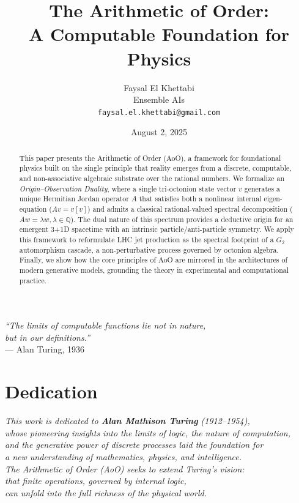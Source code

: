 \documentclass[11pt, a4paper]{article}
\title{\textbf{The Arithmetic of Order: \\ A Computable Foundation for Physics}}
\author{
    Faysal El Khettabi \\
    Ensemble AIs \\
    \texttt{faysal.el.khettabi@gmail.com}
}
\date{August 2, 2025}
\theoremstyle{definition}
\theoremstyle{remark}
\newcommand{\Q}{\mathbb{Q}}
\begin{document}
\begin{titlepage}
    \begin{flushright}
        \vspace*{2cm}
        \large
        \textit{``The limits of computable functions lie not in nature,\\
        but in our definitions.''}\\
        \vspace{0.5em}
        --- Alan Turing, 1936
    \end{flushright}
    \vfill
    \maketitle
    \thispagestyle{empty}
\end{titlepage}

\section*{Dedication}
\begin{center}
    \textit{This work is dedicated to \textbf{Alan Mathison Turing} (1912--1954), 
    \\
    whose pioneering insights into the limits of logic, the nature of computation, \\
    and the generative power of discrete processes laid the foundation for \\
    a new understanding of mathematics, physics, and intelligence. \\
    \vspace{1em}
    The Arithmetic of Order (AoO) seeks to extend Turing’s vision: \\
    that finite operations, governed by internal logic, \\
    can unfold into the full richness of the physical world.}
\end{center}

\begin{abstract}
This paper presents the Arithmetic of Order (AoO), a framework for foundational physics built on the single principle that reality emerges from a discrete, computable, and non-associative algebraic substrate over the rational numbers. We formalize an \emph{Origin–Observation Duality}, where a single tri-octonion state vector $v$ generates a unique Hermitian Jordan operator $A$ that satisfies both a nonlinear internal eigen-equation ($Av = v[v]$) and admits a classical rational-valued spectral decomposition ($Aw = \lambda w, \lambda \in \Q$). The dual nature of this spectrum provides a deductive origin for an emergent 3+1D spacetime with an intrinsic particle/anti-particle symmetry. We apply this framework to reformulate LHC jet production as the spectral footprint of a $G_2$ automorphism cascade, a non-perturbative process governed by octonion algebra. Finally, we show how the core principles of AoO are mirrored in the architectures of modern generative models, grounding the theory in experimental and computational practice.
\end{abstract}
\end{document}
